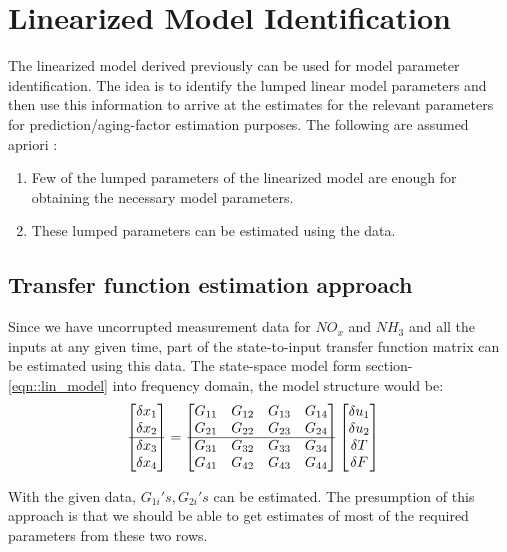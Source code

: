 \section{Linearized Model Identification}
The linearized model derived previously can be used for model parameter
identification. The idea is to identify the lumped linear model parameters and
then use this information to arrive at the estimates for the relevant parameters
for prediction/aging-factor estimation purposes. The following are assumed
apriori :

\begin{enumerate}
\item Few of the lumped parameters of the linearized model are enough for
obtaining the necessary model parameters.
\item These lumped parameters can be estimated using the data.
\end{enumerate}

\subsection{Transfer function estimation approach}
Since we have uncorrupted measurement data for $NO_x$ and $NH_3$ and all the
inputs at any given time, part of the state-to-input transfer function matrix
can be estimated using this data. The state-space model form
section-\ref{eqn::lin_model} into frequency domain, the model structure would
be:
\begin{align*}
    \begin{bmatrix} \delta x_1 \\ \delta x_2 \\ \hline \delta  x_3 \\ \delta x_4 \end{bmatrix} &= \begin{bmatrix} G_{11} & G_{12} & G_{13} & G_{14}\\
                G_{21} & G_{22} & G_{23} & G_{24}\\
                \hline
                G_{31} & G_{32} & G_{33} & G_{34}\\
                G_{41} & G_{42} & G_{43} & G_{44}\\
     \end{bmatrix}
    \begin{bmatrix} \delta u_1 \\ \delta u_2 \\ \delta T \\ \delta F \end{bmatrix}
\end{align*}

With the given data, $G_{1i}'s, G_{2i}'s$ can be estimated. The presumption of
this approach is that we should be able to get estimates of most of the required
parameters from these two rows.


